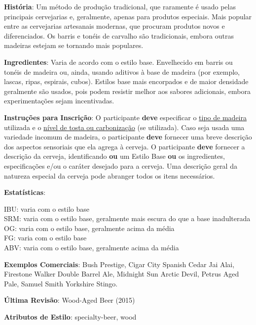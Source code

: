 \textbf{História}: Um método de produção tradicional, que raramente é usado pelas principais cervejarias e, geralmente, apenas para produtos especiais. Mais popular entre as cervejarias artesanais modernas, que procuram produtos novos e diferenciados. Os barris e tonéis de carvalho são tradicionais, embora outras madeiras estejam se tornando mais populares.

\textbf{Ingredientes}: Varia de acordo com o estilo base. Envelhecido em barris ou tonéis de madeira ou, ainda, usando aditivos à base de madeira (por exemplo, lascas, ripas, espirais, cubos). Estilos base mais encorpados e de maior densidade geralmente são usados, pois podem resistir melhor aos sabores adicionais, embora experimentações sejam incentivadas.

\textbf{Instruções para Inscrição}: O participante \textbf{deve} especificar o \underline{tipo de madeira} utilizada e o \underline{nível de tosta ou carbonização} (se utilizada). Caso seja usada uma variedade incomum de madeira, o participante \textbf{deve} fornecer uma breve descrição dos aspectos sensoriais que ela agrega à cerveja. O participante \textbf{deve} fornecer a descrição da cerveja, identificando \textbf{ou} um Estilo Base \textbf{ou} os ingredientes, especificações e/ou o caráter desejado para a cerveja. Uma descrição geral da natureza especial da cerveja pode abranger todos os itens necessários.

\textbf{Estatísticas}:

IBU: varia com o estilo base\\
SRM: varia com o estilo base, geralmente mais escura do que a base inadulterada\\
OG: varia com o estilo base, geralmente acima da média\\
FG: varia com o estilo base\\
ABV: varia com o estilo base, geralmente acima da média

\textbf{Exemplos Comerciais}: Bush Prestige, Cigar City Spanish Cedar Jai Alai, Firestone Walker Double Barrel Ale, Midnight Sun Arctic Devil, Petrus Aged Pale, Samuel Smith Yorkshire Stingo.

\textbf{Última Revisão}: Wood-Aged Beer (2015)

\textbf{Atributos de Estilo}: specialty-beer, wood
